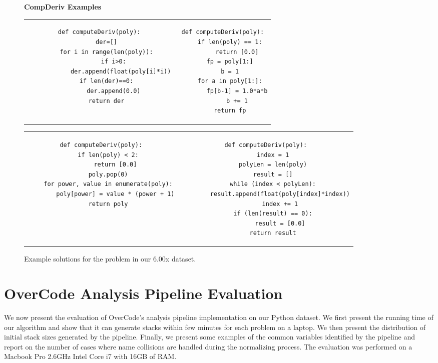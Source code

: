 \begin{figure}
{\bf CompDeriv Examples}\\
\begin{tabular}{cc} 
\begin{minipage}{0.5\linewidth}
\begin{lstlisting}[]
def computeDeriv(poly):
    der=[]
    for i in range(len(poly)):
        if i>0:
            der.append(float(poly[i]*i))
    if len(der)==0:
        der.append(0.0)
    return der

\end{lstlisting}
\end{minipage}
&
\begin{minipage}{0.5\linewidth}
\begin{lstlisting}[]
def computeDeriv(poly):
    if len(poly) == 1:
        return [0.0]
    fp = poly[1:]
    b = 1
    for a in poly[1:]:
        fp[b-1] = 1.0*a*b
        b += 1
    return fp
\end{lstlisting}
\end{minipage}
\\
\end{tabular}
\begin{tabular}{c c}
\begin{minipage}{0.4\linewidth}
\begin{lstlisting}[]
def computeDeriv(poly):
    if len(poly) < 2:
        return [0.0]
    poly.pop(0)
    for power, value in enumerate(poly):
        poly[power] = value * (power + 1)
    return poly
\end{lstlisting}
\end{minipage}
&
\begin{minipage}{0.4\linewidth}
\begin{lstlisting}[]
def computeDeriv(poly):
    index = 1
    polyLen = len(poly)
    result = []
    while (index < polyLen):
        result.append(float(poly[index]*index))
        index += 1
    if (len(result) == 0):
        result = [0.0]
    return result
\end{lstlisting}
\end{minipage}

\end{tabular}
\caption{Example solutions for the  problem in our 6.00x dataset.}
\label{cdexamples}
\end{figure}


\section{OverCode Analysis Pipeline Evaluation}
We now present the evaluation of OverCode's analysis pipeline implementation on our Python dataset. We first present the running time of our algorithm and show that it can generate stacks within few minutes for each problem on a laptop. We then present the distribution of initial stack sizes generated by the pipeline. Finally, we present some examples of the common variables identified by the pipeline and report on the number of cases where name collisions are handled during the normalizing process. The evaluation was performed on a Macbook Pro 2.6GHz Intel Core i7 with 16GB of RAM.  

